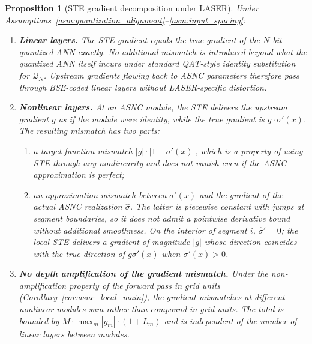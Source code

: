\documentclass{article}
\theoremstyle{plain}
\newtheorem{proposition}[theorem]{Proposition}
\theoremstyle{definition}
\theoremstyle{remark}
\begin{document}
\begin{proposition}[STE gradient decomposition under LASER]
\label{prop:ste_main}
Under Assumptions~\ref{asm:quantization_alignment}--\ref{asm:input_spacing}:
\begin{enumerate}
  \item \textbf{Linear layers.} The STE gradient equals the true gradient
        of the $N$-bit quantized ANN exactly. No additional mismatch is
        introduced beyond what the quantized ANN itself incurs under
        standard QAT-style identity substitution for $\mathcal{Q}_N$.
        Upstream gradients flowing back to ASNC parameters therefore pass
        through BSE-coded linear layers without LASER-specific distortion.
  \item \textbf{Nonlinear layers.} At an ASNC module, the STE delivers the
        upstream gradient $g$ as if the module were identity, while the
        true gradient is $g\cdot\sigma'(x)$. The resulting mismatch has two
        parts:
        \begin{enumerate}
          \item a \emph{target-function mismatch}
                $|g|\cdot|1-\sigma'(x)|$, which is a property of using STE
                through any nonlinearity and does not vanish even if the
                ASNC approximation is perfect;
          \item an \emph{approximation mismatch} between $\sigma'(x)$ and
                the gradient of the actual ASNC realization $\hat{\sigma}$.
                The latter is piecewise constant with jumps at segment
                boundaries, so it does not admit a pointwise derivative
                bound without additional smoothness. On the interior of
                segment $i$, $\hat{\sigma}'=0$; the local STE delivers a
                gradient of magnitude $|g|$ whose direction coincides with
                the true direction of $g\sigma'(x)$ when $\sigma'(x)>0$.
        \end{enumerate}
  \item \textbf{No depth amplification of the gradient mismatch.} Under
        the non-amplification property of the forward pass in grid units
        (Corollary~\ref{cor:asnc_local_main}), the gradient mismatches at
        different nonlinear modules sum rather than compound in grid units.
        The total is bounded by $M\cdot\max_m|g_m|\cdot(1+L_m)$ and is
        independent of the number of linear layers between modules.
\end{enumerate}
\end{proposition}
\end{document}
